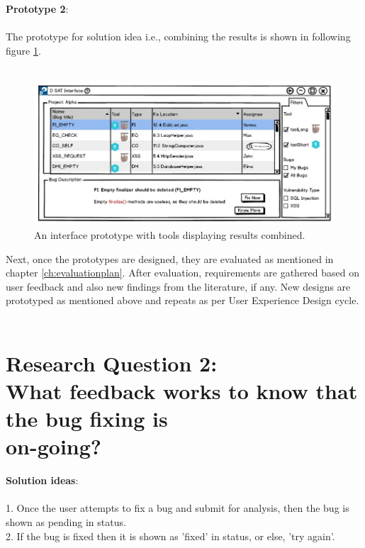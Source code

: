 \textbf{Prototype 2}: \\ \\

The prototype for solution idea i.e., combining the results is shown in following figure \ref{fig:toolCombine}. \\ \\

\begin{figure}[hbt!]
	\centering
	\includegraphics[width=\linewidth]{figures/d_combine}
	\caption{An interface prototype with tools displaying results combined.}
	\label{fig:toolCombine}
\end{figure}

Next, once the prototypes are designed, they are evaluated as mentioned in chapter \ref{ch:evaluationplan}. After evaluation, requirements are gathered based on user feedback and also new findings from the literature, if any. New designs are prototyped as mentioned above and repeats as per User Experience Design cycle. \\ \\

\section{Research Question 2: \\ What feedback works to know that the bug fixing is \\ on-going?} 

\textbf{Solution ideas}: \\ \\
1. Once the user attempts to fix a bug and submit for analysis, then the bug is shown as pending in status. \\
2. If the bug is fixed then it is shown as 'fixed' in status, or else, 'try again'. \\ \\

